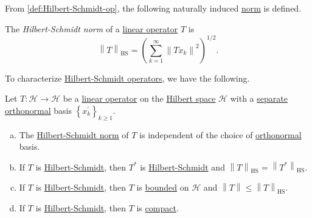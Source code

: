 From \autoref{def:Hilbert-Schmidt-op}, the following naturally induced \hyperref[def:norm]{norm} is defined.

\begin{definition}\label{def:Hilbert-Schmidt-norm}
	The \emph{Hilbert-Schmidt norm} of a \hyperref[def:linear-map]{linear operator} \(T\) is
	\[
		\left\lVert T\right\rVert _{\mathrm{HS} } = \left( \sum_{k=1}^{\infty} \left\lVert T x_{k} \right\rVert ^2 \right) ^{1 / 2}.
	\]
\end{definition}

To characterize \hyperref[def:Hilbert-Schmidt-op]{Hilbert-Schmidt operators}, we have the following.

\begin{proposition}
	Let \(T\colon \mathcal{H} \to \mathcal{H} \) be a \hyperref[def:linear-op]{linear operator} on the \hyperref[def:Hilbert-space]{Hilbert space} \(\mathcal{H} \) with a \hyperref[def:separable]{separate} \hyperref[def:orthonormal-system]{orthonormal} basis \(\left\{ x^\prime _k \right\}_{k\geq 1} \).
	\begin{enumerate}[(a)]
		\item The \hyperref[def:Hilbert-Schmidt-norm]{Hilbert-Schmidt norm} of \(T\) is independent of the choice of \hyperref[def:orthonormal-system]{orthonormal} basis.
		\item If \(T\) is \hyperref[def:Hilbert-Schmidt-op]{Hilbert-Schmidt}, then \(T^{\ast} \) is \hyperref[def:Hilbert-Schmidt-op]{Hilbert-Schmidt} and \(\left\lVert T\right\rVert _{\mathrm{HS} } = \left\lVert T^{\ast} \right\rVert _{\mathrm{HS} } \).
		\item If \(T\) is \hyperref[def:Hilbert-Schmidt-op]{Hilbert-Schmidt}, then \(T\) is \hyperref[def:bounded-linear-op]{bounded} on \(\mathcal{H} \) and \(\left\lVert T\right\rVert \leq \left\lVert T\right\rVert _{\mathrm{HS} }\).
		\item If \(T\) is \hyperref[def:Hilbert-Schmidt-op]{Hilbert-Schmidt}, then \(T\) is \hyperref[def:compact-op]{compact}.
	\end{enumerate}
\end{proposition}
